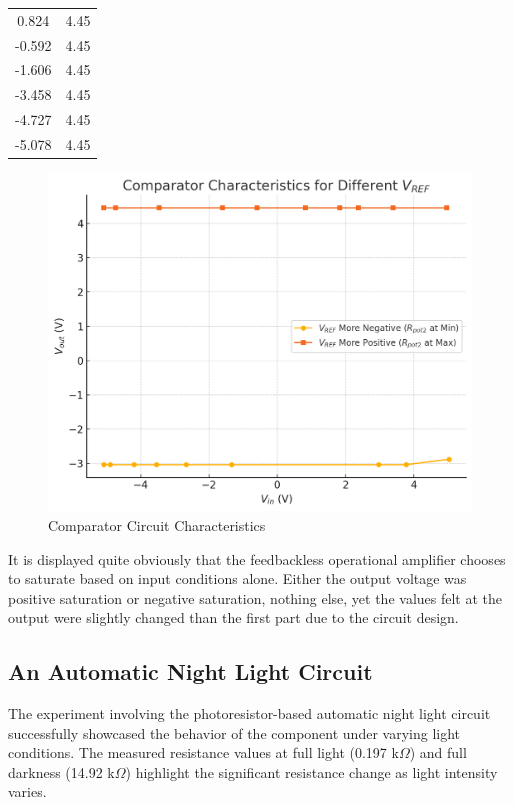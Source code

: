 \documentclass[12pt]{article}
\begin{document}
\begin{table}[H]
\begin{tabular}{|c|c|}
		0.824        & 4.45                                                        \\
		-0.592       & 4.45                                                        \\
		-1.606       & 4.45                                                        \\
		-3.458       & 4.45                                                        \\
		-4.727       & 4.45                                                        \\
		-5.078       & 4.45                                                        \\
		\hline
	\end{tabular}
	\label{tab:comparator}
\end{table}

\begin{figure}[H]
	\centering
	\includegraphics[width=12cm]{03_exp2}
	\caption{Comparator Circuit Characteristics}
	\label{fig:exp2}
\end{figure}

It is displayed quite obviously that the feedbackless operational amplifier
chooses to saturate based on input conditions alone. Either the output voltage
was positive saturation or negative saturation, nothing else, yet the values
felt at the output were slightly changed than the first part due to the circuit
design.

\subsection{An Automatic Night Light Circuit}
The experiment involving the photoresistor-based automatic night light circuit
successfully showcased the behavior of the component under varying light
conditions. The measured resistance values at full light (0.197 k$\Omega$) and
full darkness (14.92 k$\Omega$) highlight the significant resistance change as
light intensity varies.
\end{document}
